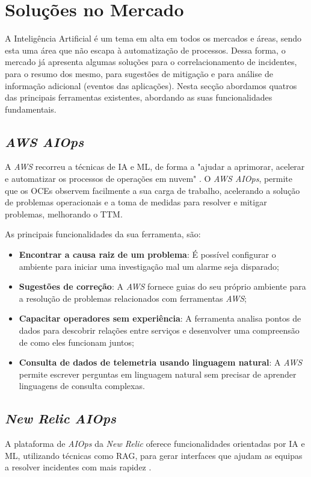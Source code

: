 \section{Soluções no Mercado}

	A Inteligência Artificial é um tema em alta em todos os mercados e áreas, sendo esta uma área que não escapa à automatização de processos. Dessa forma, o mercado já apresenta algumas soluções para o correlacionamento de incidentes, para o resumo dos mesmo, para sugestões de mitigação e para análise de informação adicional (eventos das aplicações). Nesta secção abordamos quatros das principais ferramentas existentes, abordando as suas funcionalidades fundamentais.
	
	\subsection{\textit{AWS AIOps}}
		A \textit{AWS} recorreu a técnicas de \gls{IA} e \gls{ML}, de forma a "ajudar a aprimorar, acelerar e automatizar os processos de operações em nuvem" \autocite{WebAWS}. O \textit{AWS AIOps}, permite que os \gls{OCEs} observem facilmente a sua carga de trabalho, acelerando a solução de problemas operacionais e a toma de medidas para resolver e mitigar problemas, melhorando o \gls{TTM}.
		
		As principais funcionalidades da sua ferramenta, são:
		\begin{itemize}
			\item \textbf{Encontrar a causa raiz de um problema}: É possível configurar o ambiente para iniciar uma investigação mal um alarme seja disparado;
			\item \textbf{Sugestões de correção}: A \textit{AWS} fornece guias do seu próprio ambiente para a resolução de problemas relacionados com ferramentas \textit{AWS};
			\item \textbf{Capacitar operadores sem experiência}: A ferramenta analisa pontos de dados para descobrir relações entre serviços e desenvolver uma compreensão de como eles funcionam juntos;
			\item \textbf{Consulta de dados de telemetria usando linguagem natural}: A \textit{AWS} permite escrever perguntas em linguagem natural sem precisar de aprender linguagens de consulta complexas. 
		\end{itemize}
		
	
	\subsection{\textit{New Relic AIOps}}
		A plataforma de \textit{AIOps} da \textit{New Relic} oferece funcionalidades orientadas por \gls{IA} e \gls{ML}, utilizando técnicas como \gls{RAG}, para gerar interfaces que ajudam as equipas a resolver incidentes com mais rapidez \autocite{WebNewRelic}.
		
